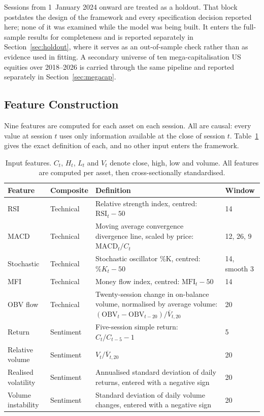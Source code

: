 \documentclass{singlecol-new}
\theoremstyle{TH}{
\newtheorem{lemma}{Lemma}
\newtheorem{theorem}[lemma]{Theorem}
\newtheorem{corrolary}[lemma]{Corrolary}
\newtheorem{conjecture}[lemma]{Conjecture}
\newtheorem{proposition}[lemma]{Proposition}
\newtheorem{claim}[lemma]{Claim}
\newtheorem{stheorem}[lemma]{Wrong Theorem}
\newtheorem{algorithm}{Algorithm}
}
\theoremstyle{THrm}{
\newtheorem{definition}{Definition}[section]
\newtheorem{question}{Question}[section]
\newtheorem{remark}{Remark}
\newtheorem{scheme}{Scheme}
}
\theoremstyle{THhit}{
\newtheorem{case}{Case}[section]
}
\begin{document}
Sessions from 1~January 2024 onward are treated as a holdout. That block postdates
the design of the framework and every specification decision reported here; none of
it was examined while the model was being built. It enters the full-sample results
for completeness and is reported separately in Section~\ref{sec:holdout}, where it
serves as an out-of-sample check rather than as evidence used in fitting. A secondary
universe of ten mega-capitalisation US equities over 2018--2026 is carried through the
same pipeline and reported separately in Section~\ref{sec:megacap}.

\subsection{Feature Construction}

Nine features are computed for each asset on each session. All are causal: every value
at session $t$ uses only information available at the close of session $t$. Table~\ref{tab:features}
gives the exact definition of each, and no other input enters the framework.

\begin{table}[!ht]
\centering
\caption{Input features. $C_t$, $H_t$, $L_t$ and $V_t$ denote close, high, low and
volume. All features are computed per asset, then cross-sectionally standardised.}
\label{tab:features}
\small
\begin{tabular}{p{2.0cm}p{1.8cm}p{5.2cm}p{1.5cm}}
\hline
\textbf{Feature} & \textbf{Composite} & \textbf{Definition} & \textbf{Window} \\
\hline
RSI & Technical & Relative strength index, centred: $\mathrm{RSI}_t - 50$ & 14 \\
\hline
MACD & Technical & Moving average convergence divergence line, scaled by price: $\mathrm{MACD}_t / C_t$ & 12, 26, 9 \\
\hline
Stochastic & Technical & Stochastic oscillator \%K, centred: $\%K_t - 50$ & 14, smooth 3 \\
\hline
MFI & Technical & Money flow index, centred: $\mathrm{MFI}_t - 50$ & 14 \\
\hline
OBV flow & Technical & Twenty-session change in on-balance volume, normalised by average volume: $(\mathrm{OBV}_t - \mathrm{OBV}_{t-20}) / \overline{V}_{t,20}$ & 20 \\
\hline
Return & Sentiment & Five-session simple return: $C_t / C_{t-5} - 1$ & 5 \\
\hline
Relative volume & Sentiment & $V_t / \overline{V}_{t,20}$ & 20 \\
\hline
Realised volatility & Sentiment & Annualised standard deviation of daily returns, entered with a negative sign & 20 \\
\hline
Volume instability & Sentiment & Standard deviation of daily volume changes, entered with a negative sign & 20 \\
\hline
\end{tabular}
\end{table}
\end{document}
